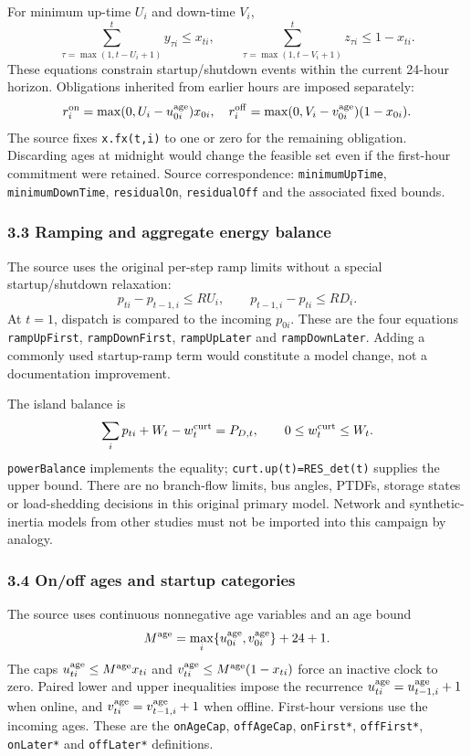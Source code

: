 \documentclass[
  11pt,
  a4paper,
]{article}
\begin{document}
For minimum up-time \(U_i\) and down-time \(V_i\), \[
\sum_{\tau=\max(1,t-U_i+1)}^t y_{\tau i}\le x_{ti},\qquad
\sum_{\tau=\max(1,t-V_i+1)}^t z_{\tau i}\le1-x_{ti}.
\] These equations constrain startup/shutdown events within the current
24-hour horizon. Obligations inherited from earlier hours are imposed
separately: \[
r_i^{\rm on}=\max(0,U_i-u_{0i}^{\rm age})x_{0i},\quad
r_i^{\rm off}=\max(0,V_i-v_{0i}^{\rm age})(1-x_{0i}).
\] The source fixes \texttt{x.fx(t,i)} to one or zero for the remaining
obligation. Discarding ages at midnight would change the feasible set
even if the first-hour commitment were retained. Source correspondence:
\texttt{minimumUpTime}, \texttt{minimumDownTime}, \texttt{residualOn},
\texttt{residualOff} and the associated fixed bounds.

\subsubsection{3.3 Ramping and aggregate energy
balance}\label{ramping-and-aggregate-energy-balance}

The source uses the original per-step ramp limits without a special
startup/shutdown relaxation: \[
p_{ti}-p_{t-1,i}\le RU_i,\qquad p_{t-1,i}-p_{ti}\le RD_i.
\] At \(t=1\), dispatch is compared to the incoming \(p_{0i}\). These
are the four equations \texttt{rampUpFirst}, \texttt{rampDownFirst},
\texttt{rampUpLater} and \texttt{rampDownLater}. Adding a commonly used
startup-ramp term would constitute a model change, not a documentation
improvement.

The island balance is \[
\sum_i p_{ti}+W_t-w_t^{\rm curt}=P_{D,t},\qquad 0\le w_t^{\rm curt}\le W_t.
\] \texttt{powerBalance} implements the equality;
\texttt{curt.up(t)=RES\_det(t)} supplies the upper bound. There are no
branch-flow limits, bus angles, PTDFs, storage states or load-shedding
decisions in this original primary model. Network and synthetic-inertia
models from other studies must not be imported into this campaign by
analogy.

\subsubsection{3.4 On/off ages and startup
categories}\label{onoff-ages-and-startup-categories}

The source uses continuous nonnegative age variables and an age bound \[
M^{\rm age}=\max_i\{u_{0i}^{\rm age},v_{0i}^{\rm age}\}+24+1.
\] The caps \(u_{ti}^{\rm age}\le M^{\rm age}x_{ti}\) and
\(v_{ti}^{\rm age}\le M^{\rm age}(1-x_{ti})\) force an inactive clock to
zero. Paired lower and upper inequalities impose the recurrence
\(u_{ti}^{\rm age}=u_{t-1,i}^{\rm age}+1\) when online, and
\(v_{ti}^{\rm age}=v_{t-1,i}^{\rm age}+1\) when offline. First-hour
versions use the incoming ages. These are the \texttt{onAgeCap},
\texttt{offAgeCap}, \texttt{onFirst*}, \texttt{offFirst*},
\texttt{onLater*} and \texttt{offLater*} definitions.
\end{document}
